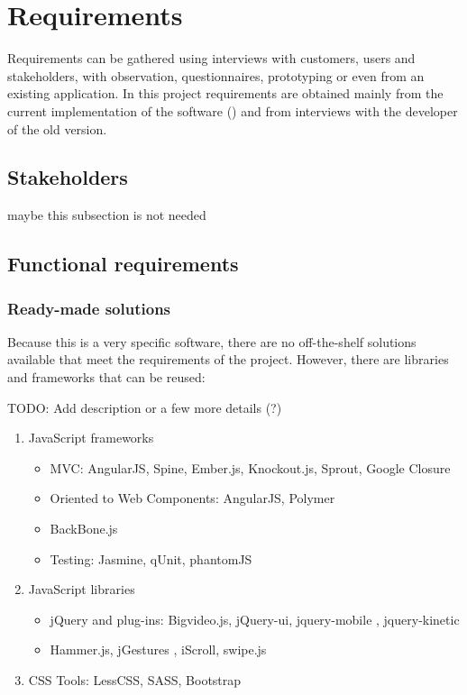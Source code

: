 \chapter{Requirements}
Requirements can be gathered using interviews with customers, users and stakeholders, with observation, questionnaires, prototyping or even from an existing application.
In this project requirements are obtained mainly from the current implementation of the software () and from interviews with the developer of the old version.

\section{Stakeholders}
maybe this subsection is not needed

\section{Functional requirements}

\subsection{Ready-made solutions}
Because this is a very specific software, there are no off-the-shelf solutions available that meet the requirements of the project.
However, there are libraries and frameworks that can be reused:

TODO: Add description or a few more details (?)

\begin{enumerate}
    \item JavaScript frameworks
    \begin{itemize}
        \item \ac{MVC}: AngularJS, Spine, Ember.js, Knockout.js, Sprout, Google Closure
        \item Oriented to Web Components: AngularJS, Polymer
        \item BackBone.js
    \item Testing: Jasmine, qUnit, phantomJS   
    \end{itemize}
    \item JavaScript libraries
    \begin{itemize}
        \item jQuery and plug-ins: Bigvideo.js, jQuery-ui, jquery-mobile , jquery-kinetic  
        \item Hammer.js, jGestures , iScroll, swipe.js
    \end{itemize} 
    \item \ac{CSS} Tools: LessCSS, SASS, Bootstrap
\end{enumerate}

